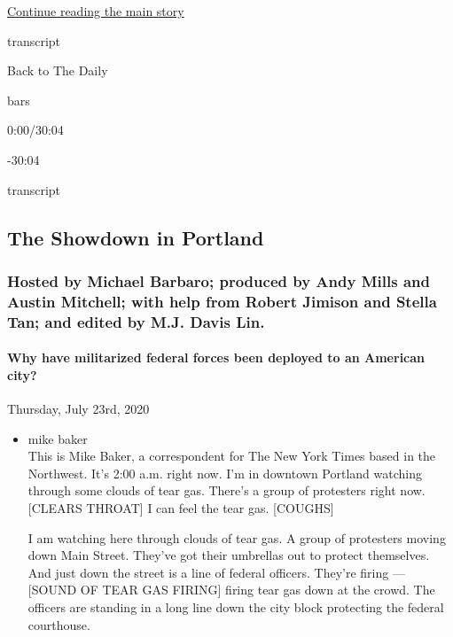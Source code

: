 \protect\hyperlink{after-top}{Continue reading the main story}

transcript

Back to The Daily

bars

0:00/30:04

-30:04

transcript

\hypertarget{the-showdown-in-portland}{%
\subsection{The Showdown in Portland}\label{the-showdown-in-portland}}

\hypertarget{hosted-by-michael-barbaro-produced-by-andy-mills-and-austin-mitchell-with-help-from-robert-jimison-and-stella-tan-and-edited-by-mj-davis-lin}{%
\subsubsection{Hosted by Michael Barbaro; produced by Andy Mills and
Austin Mitchell; with help from Robert Jimison and Stella Tan; and
edited by M.J. Davis
Lin.}\label{hosted-by-michael-barbaro-produced-by-andy-mills-and-austin-mitchell-with-help-from-robert-jimison-and-stella-tan-and-edited-by-mj-davis-lin}}

\hypertarget{why-have-militarized-federal-forces-been-deployed-to-an-american-city}{%
\paragraph{Why have militarized federal forces been deployed to an
American
city?}\label{why-have-militarized-federal-forces-been-deployed-to-an-american-city}}

Thursday, July 23rd, 2020

\begin{itemize}
\item
  mike baker\\
  This is Mike Baker, a correspondent for The New York Times based in
  the Northwest. It's 2:00 a.m. right now. I'm in downtown Portland
  watching through some clouds of tear gas. There's a group of
  protesters right now. {[}CLEARS THROAT{]} I can feel the tear gas.
  {[}COUGHS{]}

  I am watching here through clouds of tear gas. A group of protesters
  moving down Main Street. They've got their umbrellas out to protect
  themselves. And just down the street is a line of federal officers.
  They're firing --- {[}SOUND OF TEAR GAS FIRING{]} firing tear gas down
  at the crowd. The officers are standing in a long line down the city
  block protecting the federal courthouse.
\end{itemize}

